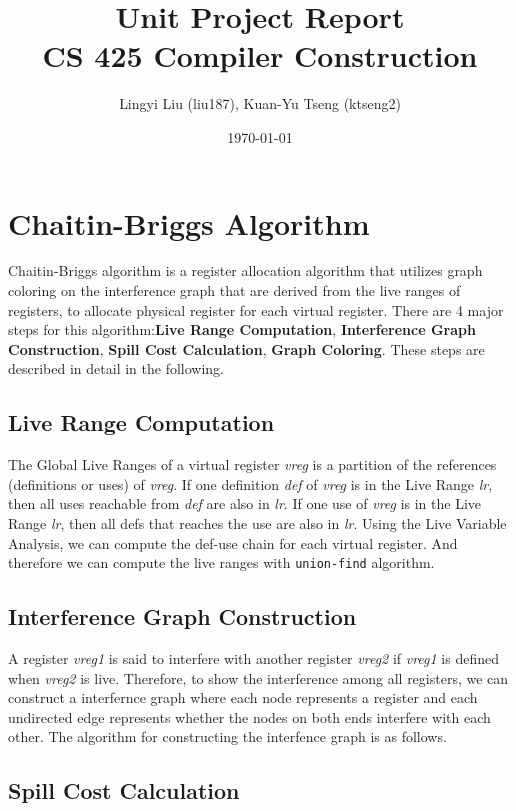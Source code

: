 \documentclass{article}
\title{Unit Project Report \\ CS 425 Compiler Construction} %
\author{Lingyi Liu (liu187), Kuan-Yu Tseng (ktseng2)} %
\date{\today} %
\begin{document}
\maketitle %


\section{Chaitin-Briggs Algorithm}
Chaitin-Briggs algorithm\cite{Chaitin:1982} is a register allocation algorithm that utilizes graph coloring on the interference graph that are derived from the live ranges of registers, to allocate physical register for each virtual register. There are 4 major steps for this algorithm:\textbf{Live Range Computation}, \textbf{Interference Graph Construction}, \textbf{Spill Cost Calculation}, \textbf{Graph Coloring}. These steps are described in detail in the following.
\subsection{Live Range Computation}
The Global Live Ranges of a virtual register \emph{vreg} is a partition of the references (definitions or uses) of \emph{vreg}. If one definition \emph{def} of \emph{vreg} is in the Live Range \emph{lr}, then all uses reachable from \emph{def} are also in \emph{lr}. If one use of \emph{vreg} is in the Live Range \emph{lr}, then all defs that reaches the use are also in \emph{lr}. Using the Live Variable Analysis, we can compute the def-use chain for each virtual register. And therefore we can compute the live ranges with \texttt{union-find} algorithm.
\subsection{Interference Graph Construction}
A register \emph{vreg1} is said to interfere with another register \emph{vreg2} if \emph{vreg1} is defined when \emph{vreg2} is live. Therefore, to show the interference among all registers, we can construct a interfernce graph where each node represents a register and each undirected edge represents whether the nodes on both ends interfere with each other. The algorithm for constructing the interfence graph is as follows.
\subsection{Spill Cost Calculation}
\end{document}
